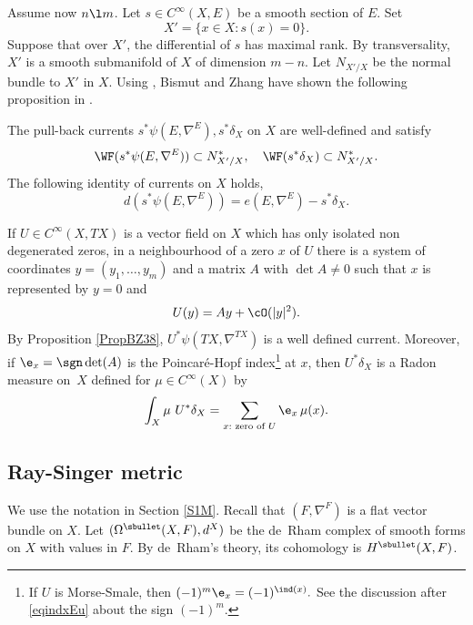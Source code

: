 Assume now $n\l m$. Let $s\in C^{\infty}(X,E)$ be a smooth section of $E$. Set
\begin{equation}\label{eqX0}
X'=\{x\in X:s(x)=0\}.
\end{equation}
Suppose that over $X'$, the differential of $s$ has maximal rank. By transversality,
$X'$ is a smooth submanifold of $X$ of dimension $m-n$. Let $N_{X'/X}$ be the normal bundle to $X'$ in $X$. Using \cite[Th.\,8.2.4]{HormanderBook1}, Bismut and Zhang have shown the following proposition in \cite[Rem.\,3.8]{BZ92}.

\begin{prop}\label{PropBZ38}
The pull-back currents $s^{*}\psi(E,\nabla^{E}),
s^{*}\delta_{X}$ on $X$ are well-defined and satisfy
\begin{equation}\label{eqWFsd}
\WF(s^{*}\psi(E,\nabla^{E}))\subset N_{X'/X}^{*},\quad\WF(s^{*}\delta_{X})\subset N^{*}_{X'/X}.
\end{equation}
The following identity of currents on $X$ holds,
\begin{equation}\label{eqsphi}
d(s^{*}\psi(E,\nabla^{E}))=e(E,\nabla^{E})-s^{*}\delta_{X}.
\end{equation}
\end{prop}

\begin{re}\label{reBZ38}
If $U\in C^{\infty}(X,TX)$ is a vector field on $X$ which has only isolated non degenerated
zeros, \ie in a neighbourhood of a zero $x$ of $U$ there is a
system of coordinates $y=(y_{1},\ldots,y_{m})$ and a matrix
$A$ with $\det
A\neq0$ such that $x$ is represented by $y=0$ and
\begin{equation*}\label{eqU=Ay}
U(y)=Ay+\cO(|y|^{2}).
\end{equation*}
By Proposition \ref{PropBZ38}, $U^{*}\psi(TX,\nabla^{TX})$ is a well
defined current. Moreover, if $\e_{x}=\sgn\det(A)$ is the Poincaré-Hopf
index\footnote{If $U$ is Morse-Smale, then $(-1)^{m}\e_{x}=(-1)^{\ind(x)}.$ See the discussion
after \eqref{eqindxEu} about the sign $(-1)^{m}$.} at $x$, then
$U^{*}\delta_{X}$ is a Radon measure on~$X$ defined for $\mu\in
C^{\infty}(X)$ by
\begin{equation}\label{eqUindd}
\int_{X}\mu \ U^{*}\delta_{X}=\sum_{x:\text{ zero of }U}\e_{x}\,\mu(x).
\end{equation}
\end{re}

\subsection{Ray-Singer metric}\label{sRS}
We use the notation in Section \ref{S1M}. Recall that $(F,\nabla^{F})$ is a flat vector bundle on $X$.
Let $(\Omega^{\sbullet}(X,F),d^{X})$ be the de~Rham complex of smooth
forms on $X$ with values in
$F$. By de~Rham's theory, its cohomology is $H^{\sbullet}(X,F)$.

